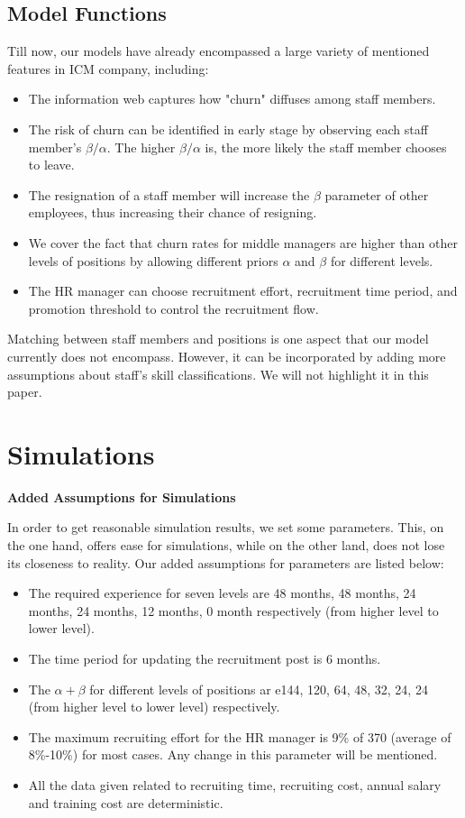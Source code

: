 \documentclass[tcn = 37075, sheet = false, abstract = false]{mcmthesis}
\begin{document}
	\subsection{Model Functions}
	
	Till now, our models have already encompassed a large variety of mentioned features in ICM company, including:
	
	\begin{itemize}
		\item The information web captures how "churn" diffuses among staff members.
		\item The risk of churn can be identified in early stage by observing each staff member's $\beta/\alpha$. The higher $\beta/\alpha$ is, the more likely the staff member chooses to leave.
		\item The resignation of a staff member will increase the $\beta$ parameter of other employees, thus increasing their chance of resigning.
		\item We cover the fact that churn rates for middle managers are higher than other levels of positions by allowing different priors $\alpha$ and $\beta$ for different levels.
		\item The HR manager can choose recruitment effort, recruitment time period, and promotion threshold to control the recruitment flow.
	\end{itemize}
	
	Matching between staff members and positions is one aspect that our model currently does not encompass. However, it can be incorporated by adding more assumptions about staff's skill classifications. We will not highlight it in this paper.
	
	
	\section{Simulations}
	
	\textbf{Added Assumptions for Simulations}
	
	In order to get reasonable simulation results, we set some parameters. This, on the one hand, offers ease for simulations, while on the other land, does not lose its closeness to reality. Our added assumptions for parameters are listed below:
	\begin{itemize}
		\item The required experience for seven levels are 48 months, 48 months, 24 months, 24 months, 12 months, 0 month respectively (from higher level to lower level).
		\item The time period for updating the recruitment post is 6 months.
		\item The $\alpha + \beta$ for different levels of positions ar e144, 120, 64, 48, 32, 24, 24 (from higher level to lower level) respectively.
		\item The maximum recruiting effort for the HR manager is 9\% of 370 (average of 8\%-10\%) for most cases. Any change in this parameter will be mentioned.
		\item All the data given related to recruiting time, recruiting cost, annual salary and training cost are deterministic.
	\end{itemize}
	
\end{document}
